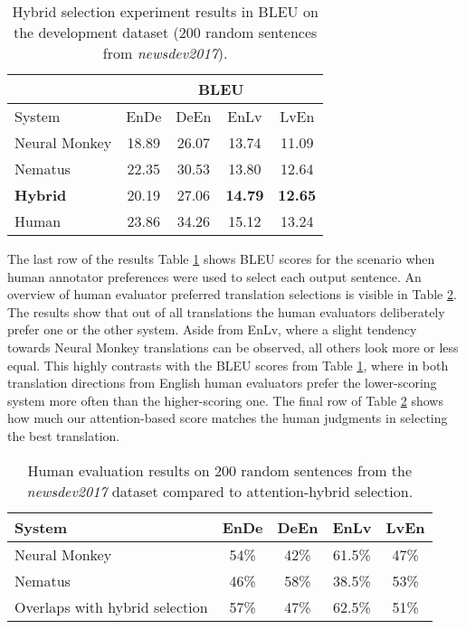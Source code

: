 \documentclass[]{article}
\begin{document}
\begin{table}[h]
  \begin{center}
    \begin{tabular}{|l|c|c|c|c|}
      \hline 
       & \multicolumn{4}{|c|}{BLEU} \\ 
      \hline 
      System & EnDe & DeEn & EnLv & LvEn\\ 
      \hline 
      Neural Monkey	& 18.89 	& 26.07 	& 13.74 		& 11.09 \\
      Nematus		& 22.35 	& 30.53 	& 13.80 		& 12.64 \\
      \bf Hybrid 	& 20.19 	& 27.06 	& \bf 14.79 	& \bf 12.65 \\
      \hline 
      Human 		& 23.86 	& 34.26 	& 15.12 		& 13.24 \\
      \hline
    \end{tabular}
  \end{center}
  \caption{Hybrid selection experiment results in BLEU on the development dataset (200 random sentences from \textit{newsdev2017}).}
  \label{tab:hyb-results}
\end{table}

The last row of the results Table \ref{tab:hyb-results} shows BLEU scores for the scenario when human annotator preferences were used to select each output sentence. An overview of human evaluator preferred translation selections is visible in Table \ref{tab:human-hyb-results}. The results show that out of all translations the human evaluators deliberately prefer one or the other system. Aside from EnLv, where a slight tendency towards Neural Monkey translations can be observed, all others look more or less equal. This highly contrasts with the BLEU scores from Table \ref{tab:hyb-results}, where in both translation directions from English human evaluators prefer the lower-scoring system more often than the higher-scoring one.
The final row of Table \ref{tab:human-hyb-results} shows how much our attention-based score matches the human judgments in selecting the best translation.

\begin{table}[h]
  \begin{center}
    \begin{tabular}{|l|c|c|c|c|}
      \hline 
      System & EnDe  & DeEn & EnLv &  LvEn\\ 
      \hline 
      Neural Monkey						& 54\% 		& 42\% 		& 61.5\% 	& 47\% \\
      Nematus							& 46\% 		& 58\% 		& 38.5\% 	& 53\% \\
      \hline 
      Overlaps with hybrid selection 	& 57\% 		& 47\% 		& 62.5\% 	& 51\% \\
      \hline
    \end{tabular}
  \end{center}
  \caption{Human evaluation results on 200 random sentences from the \textit{newsdev2017} dataset compared to attention-hybrid selection.}
  \label{tab:human-hyb-results}
\end{table}
\end{document}
